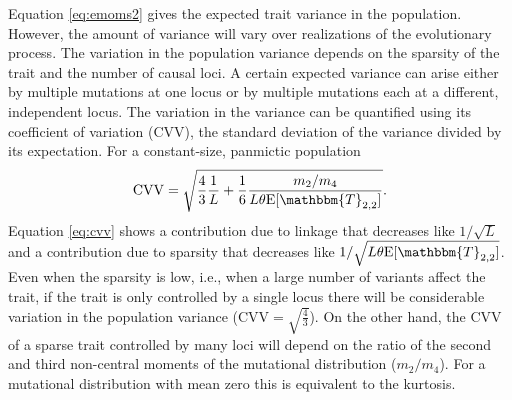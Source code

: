 Equation \eqref{eq:emoms2} gives the expected trait variance in the population.
However, the amount of variance will vary over realizations of the evolutionary
process. The variation in the population variance depends on the sparsity of the
trait and the number of causal loci. A certain expected variance can arise
either by multiple mutations at one locus or by multiple mutations each at a
different, independent locus. The variation in the variance can be quantified
using its coefficient of variation (CVV), the standard deviation of the variance
divided by its expectation. For a constant-size, panmictic population
\begin{equation}
  \label{eq:cvv}
  \mathrm{CVV} = \sqrt{\frac{4}{3}\frac{1}{L} +
    \frac{1}{6}\frac{m_2/m_4}{L\theta \E[\mathbbm{T}_{2,2}]}}.
\end{equation}
Equation \eqref{eq:cvv} shows a contribution due to linkage that decreases like
$1/\sqrt{L}$ and a contribution due to sparsity that decreases like
$1/\sqrt{L\theta \E[\mathbbm{T}_{2,2}]}$. Even when the sparsity is low, i.e.,
when a large number of variants affect the trait, if the trait is only
controlled by a single locus there will be considerable variation in the
population variance (CVV$=\sqrt{\frac{4}{3}}$). On the other hand, the CVV of a
sparse trait controlled by many loci will depend on the ratio of the second and
third non-central moments of the mutational distribution ($m_2/m_4$). For a
mutational distribution with mean zero this is equivalent to the kurtosis. 
